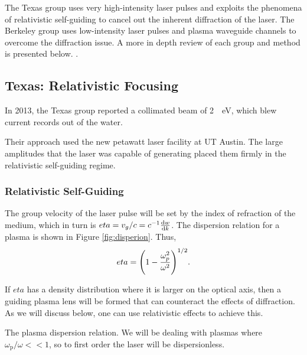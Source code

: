 \documentclass[12pt,letter]{article}
\renewcommand{\footnotesize}{\scriptsize}
\begin{document}
The Texas group uses very high-intensity laser pulses and exploits the
phenomena of relativistic self-guiding to cancel out the inherent diffraction
of the laser. The Berkeley group uses low-intensity laser pulses and plasma waveguide channels to overcome the diffraction issue. A more in depth review of
each group and method is presented below. 
.

\subsection{Texas: Relativistic Focusing}

In 2013, the Texas group reported a collimated beam of \SI{2}{\giga
\electronvolt}, which blew current records out of the
water\cite{Wang2013}.

Their approach used the new petawatt laser facility at UT Austin. The large
amplitudes that the laser was capable of generating placed them firmly in the
relativistic self-guiding regime.

\subsubsection{Relativistic Self-Guiding}
The group velocity of the laser pulse will be set by the index of refraction of
the medium, which in turn is $eta = v_g/c = c^{-1}\dv{w}{k}$.  The dispersion
relation for a plasma is shown in Figure \ref{fig:disperion}. Thus,
\begin{equation}
    \label{eq:index}
    eta = \qty(1-\frac{\omega_p^2}{\omega^2})^{1/2}.
\end{equation}

If $eta$ has a density distribution where it is larger on the optical axis, then
a guiding plasma lens will be formed that can counteract the effects of
diffraction. As we will discuss below, one can use relativistic effects to
achieve this. 
\begin{marginfigure}
    \caption{\label{fig:dispersion}The plasma dispersion relation. We will be
        dealing with plasmas where $\omega_\mathrm{p}/\omega << 1$, so to
    first order the laser will be dispersionless. }
    \end{marginfigure}
\end{document}
